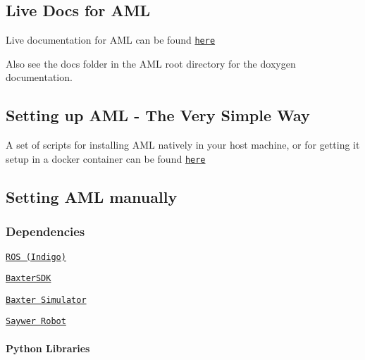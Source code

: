 \subsection*{Live Docs for A\-M\-L}


\begin{DoxyItemize}
\item Live documentation for A\-M\-L can be found \href{https://docs.google.com/document/d/1_xM5TvY-ARBdU3P3D4MrxzcuUbaHkiwEP5UDHMdy4yM/edit?usp=sharing}{\tt here}
\item Also see the docs folder in the A\-M\-L root directory for the doxygen documentation.
\end{DoxyItemize}

\subsection*{Setting up A\-M\-L -\/ The Very Simple Way}


\begin{DoxyItemize}
\item A set of scripts for installing A\-M\-L natively in your host machine, or for getting it setup in a docker container can be found \href{https://github.com/eaa3/aml_install}{\tt here}
\end{DoxyItemize}

\subsection*{Setting A\-M\-L manually}

\subsubsection*{Dependencies}


\begin{DoxyItemize}
\item \href{http://wiki.ros.org/indigo/Installation/Ubuntu}{\tt R\-O\-S (Indigo)}
\item \href{http://sdk.rethinkrobotics.com/wiki/Hello_Baxter}{\tt Baxter\-S\-D\-K}
\item \href{http://sdk.rethinkrobotics.com/wiki/Simulator_Installation}{\tt Baxter Simulator}
\item \href{http://sdk.rethinkrobotics.com/intera/Main_Page}{\tt Saywer Robot}
\end{DoxyItemize}

\paragraph*{Python Libraries}


